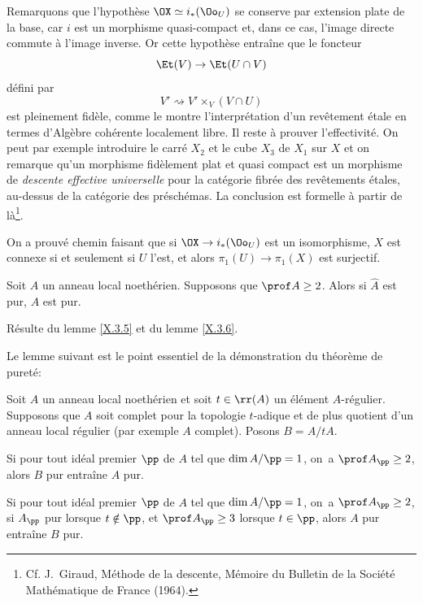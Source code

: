 Remarquons que l'hypoth\`ese $\OX\simeq i_\ast(\Oo_U)$ se conserve par extension plate de la base, car $i$ est un morphisme quasi-compact et, dans ce cas, l'image directe commute \`a l'image inverse. Or cette hypoth\`ese entra\^ine que le foncteur
\[
\Et(V) \to \Et(U\cap V)
\]
d\'efini par
\[
V'\rightsquigarrow V'\times_V(V\cap U)
\]
est pleinement fid\`ele, comme le montre l'interpr\'etation d'un rev\^etement \'etale en termes d'Alg\`ebre coh\'erente localement libre. Il reste \`a prouver l'effectivit\'e. On peut par exemple introduire le carr\'e $X_2$ et le cube $X_3$ de $X_1$ sur $X$ et on remarque qu'un morphisme fid\`element plat et quasi compact est un morphisme de \emph{descente effective universelle} pour la cat\'egorie fibr\'ee des rev\^etements \'etales, au-dessus de la cat\'egorie des pr\'esch\'emas. La conclusion est formelle \`a partir de l\`a\footnote{Cf. J.~Giraud, M\'ethode de la descente, M\'emoire  du Bulletin de la Soci\'et\'e Math\'ematique de France (1964).}.

\begin{remarque} \label{X.3.7}
On a prouv\'e chemin faisant que si $\OX\to i_\ast(\Oo_U)$ est un isomorphisme, $X$ est connexe si et seulement si $U$ l'est, et alors $\pi_1(U)\to\pi_1(X)$ est surjectif.
\end{remarque}

\begin{corollaire} \label{X.3.8}
Soit $A$ un anneau local noeth\'erien. Supposons que $\prof A\geq 2$. Alors si $\hat{A}$ est pur, $A$ est pur.
\end{corollaire}

R\'esulte du lemme \ref{X.3.5} et du lemme \ref{X.3.6}.

Le lemme suivant est le point essentiel de la d\'emonstration du th\'eor\`eme de puret\'e:

\begin{lemme} \label{X.3.9}
Soit $A$ un anneau local noeth\'erien et soit $t\in\rr(A)$ un \'el\'ement $A$-r\'egulier. Supposons que $A$ soit complet pour la topologie $t$-adique et de plus quotient d'un anneau local r\'egulier (par exemple $A$ complet). Posons $B=A/tA$.
\begin{enumeratei}
\item
Si pour tout id\'eal premier $\pp$ de $A$ tel que $\dim A/\pp=1$, on~a $\prof A_{\pp}\geq 2$, alors $B$ pur entra\^ine $A$ pur.

\item
Si pour tout id\'eal premier $\pp$ de $A$ tel que $\dim A/\pp=1$, on~a $\prof A_{\pp}\geq 2$, si $A_\pp$ pur lorsque $t\notin\pp$, et \ignorespaces $\prof A_\pp\geq3$ lorsque $t\in\pp$, alors $A$ pur entra\^ine $B$ pur.
\end{enumeratei}
\end{lemme}

